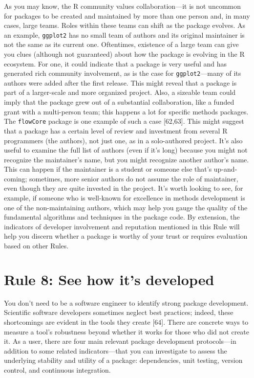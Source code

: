 \documentclass[10pt,letterpaper]{article}
\begin{document}
As you may know, the R community values collaboration---it is not
uncommon for packages to be created and maintained by more than one
person and, in many cases, large teams. Roles within these teams can
shift as the package evolves. As an example, \texttt{ggplot2} has no
small team of authors and its original maintainer is not the same as its
current one. Oftentimes, existence of a large team can give you clues
(although not guaranteed) about how the package is evolving in the R
ecosystem. For one, it could indicate that a package is very useful and
has generated rich community involvement, as is the case for
\texttt{ggplot2}---many of its authors were added after the first
release. This might reveal that a package is part of a larger-scale and
more organized project. Also, a sizeable team could imply that the
package grew out of a substantial collaboration, like a funded grant
with a multi-person team; this happens a lot for specific methods
packages. The \texttt{flowCore} package is one example of such a case
{[}62,63{]}. This might suggest that a package has a certain level of
review and investment from several R programmers (the authors), not just
one, as in a solo-authored project. It's also useful to examine the full
list of authors (even if it's long) because you might not recognize the
maintainer's name, but you might recognize another author's name. This
can happen if the maintainer is a student or someone else that's
up-and-coming; sometimes, more senior authors do not assume the role of
maintainer, even though they are quite invested in the project. It's
worth looking to see, for example, if someone who is well-known for
excellence in methods development is one of the non-maintaining authors,
which may help you gauge the quality of the fundamental algorithms and
techniques in the package code. By extension, the indicators of
developer involvement and reputation mentioned in this Rule will help
you discern whether a package is worthy of your trust or requires
evaluation based on other Rules.

\hypertarget{rule-8-see-how-its-developed}{%
\section{Rule 8: See how it's
developed}\label{rule-8-see-how-its-developed}}

You don't need to be a software engineer to identify strong package
development. Scientific software developers sometimes neglect best
practices; indeed, these shortcomings are evident in the tools they
create {[}64{]}. There are concrete ways to measure a tool's robustness
beyond whether it works for those who did not create it. As a user,
there are four main relevant package development protocols---in addition
to some related indicators---that you can investigate to assess the
underlying stability and utility of a package: dependencies, unit
testing, version control, and continuous integration.
\end{document}
